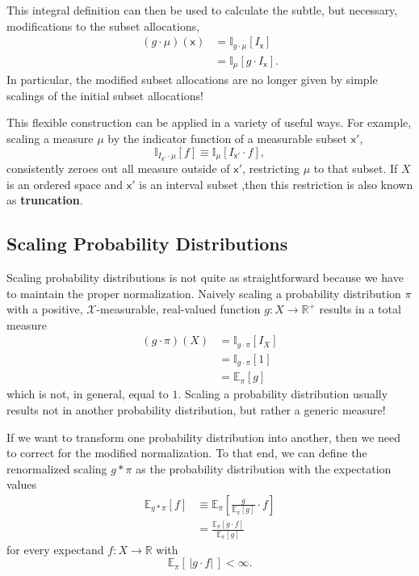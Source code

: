 \documentclass[
  letterpaper,
  DIV=11,
  numbers=noendperiod]{scrartcl}
\begin{document}
This integral definition can then be used to calculate the subtle, but
necessary, modifications to the subset allocations, \begin{align*}
(g \cdot \mu)(\mathsf{x})
&=
\mathbb{I}_{g \cdot \mu} [ I_{\mathsf{x}} ]
\\
&=
\mathbb{I}_{\mu} [ g \cdot I_{\mathsf{x}} ].
\end{align*} In particular, the modified subset allocations are no
longer given by simple scalings of the initial subset allocations!

This flexible construction can be applied in a variety of useful ways.
For example, scaling a measure \(\mu\) by the indicator function of a
measurable subset \(\mathsf{x}'\), \[
\mathbb{I}_{I_{\mathsf{x}'} \cdot \mu} [ f ]
\equiv
\mathbb{I}_{\mu} [ I_{\mathsf{x}'} \cdot f ],
\] consistently zeroes out all measure outside of \(\mathsf{x}'\),
restricting \(\mu\) to that subset. If \(X\) is an ordered space and
\(\mathsf{x}'\) is an interval subset ,then this restriction is also
known as \textbf{truncation}.

\subsection{Scaling Probability
Distributions}\label{scaling-probability-distributions}

Scaling probability distributions is not quite as straightforward
because we have to maintain the proper normalization. Naively scaling a
probability distribution \(\pi\) with a positive,
\(\mathcal{X}\)-measurable, real-valued function
\(g : X \rightarrow \mathbb{R}^{+}\) results in a total measure
\begin{align*}
(g \cdot \pi)(X)
&=
\mathbb{I}_{g \cdot \pi} [ I_{X} ]
\\
&=
\mathbb{I}_{g \cdot \pi} [ 1 ]
\\
&=
\mathbb{E}_{\pi} [ g ]
\end{align*} which is not, in general, equal to \(1\). Scaling a
probability distribution usually results not in another probability
distribution, but rather a generic measure!

If we want to transform one probability distribution into another, then
we need to correct for the modified normalization. To that end, we can
define the renormalized scaling \(g \ast \pi\) as the probability
distribution with the expectation values \begin{align*}
\mathbb{E}_{g \ast \pi} [ f ]
&\equiv
\mathbb{E}_{\pi} \left[ \frac{g}{ \mathbb{E}_{\pi} [ g ] } \cdot f \right]
\\
&=
\frac{ \mathbb{E}_{\pi} [ g \cdot f ] }{ \mathbb{E}_{\pi} [ g ] }
\end{align*} for every expectand \(f: X \rightarrow \mathbb{R}\) with \[
\mathbb{E}_{\pi} [ \, | g \cdot f | \, ] < \infty.
\]
\end{document}

